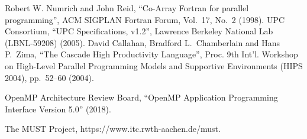 %
%
% 
% 
%

\begin{thebibliography}{99.}%
%
%
 Robert W. Numrich and John Reid, ``Co-Array Fortran for
		parallel programming'', ACM SIGPLAN Fortran Forum, Vol.~17,
		No.~2 (1998).
 UPC Consortium, ``UPC Specifications, v1.2'', Lawrence
		Berkeley National Lab (LBNL-59208) (2005).
 David Callahan, Bradford L.~Chamberlain and Hans
		P.~Zima,  ``The Cascade High Productivity Language'', Proc. 9th
		Int'l. Workshop on High-Level Parallel Programming Models and
		Supportive Environments (HIPS 2004), pp.~52--60 (2004).

		{OpenMP Architecture Review Board}, ``OpenMP Application
		Programming Interface Version 5.0'' (2018).


{The MUST Project},
\newblock https://www.itc.rwth-aachen.de/must.


\end{thebibliography}
